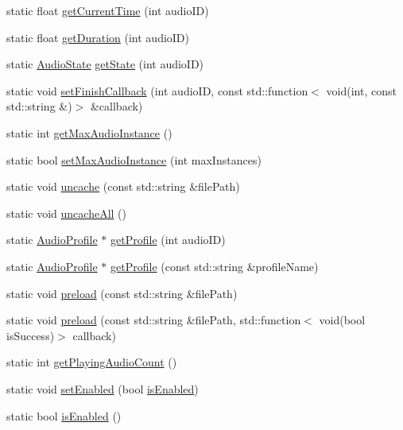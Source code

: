 \begin{DoxyCompactItemize}
\item 
static float \hyperlink{classexperimental_1_1AudioEngine_a03c38415583bde325e604cc9310d06ad}{get\+Current\+Time} (int audio\+ID)
\item 
static float \hyperlink{classexperimental_1_1AudioEngine_a09b8db5b79cc1dbdd99b57047cbc9d79}{get\+Duration} (int audio\+ID)
\item 
static \hyperlink{classexperimental_1_1AudioEngine_ab7becf9cab1f5e4cac089a1f6e3785e6}{Audio\+State} \hyperlink{classexperimental_1_1AudioEngine_a866cda5e583d0dce1b74fa596cae8ac1}{get\+State} (int audio\+ID)
\item 
static void \hyperlink{classexperimental_1_1AudioEngine_a641027899b3a5145093c4db1fae2d1ed}{set\+Finish\+Callback} (int audio\+ID, const std\+::function$<$ void(int, const std\+::string \&)$>$ \&callback)
\item 
static int \hyperlink{classexperimental_1_1AudioEngine_aa372906cea71863ac9c75873477ab049}{get\+Max\+Audio\+Instance} ()
\item 
static bool \hyperlink{classexperimental_1_1AudioEngine_a98a3cd56d393541c2c9d82620bbe0d84}{set\+Max\+Audio\+Instance} (int max\+Instances)
\item 
static void \hyperlink{classexperimental_1_1AudioEngine_ad4845a8b7855fc7f40058c86069f2a80}{uncache} (const std\+::string \&file\+Path)
\item 
static void \hyperlink{classexperimental_1_1AudioEngine_acd68e5058545e8daf10e28c5e66e8ef5}{uncache\+All} ()
\item 
static \hyperlink{classexperimental_1_1AudioProfile}{Audio\+Profile} $\ast$ \hyperlink{classexperimental_1_1AudioEngine_a9681b3ec692d7db066f9a4ce1564a5d2}{get\+Profile} (int audio\+ID)
\item 
static \hyperlink{classexperimental_1_1AudioProfile}{Audio\+Profile} $\ast$ \hyperlink{classexperimental_1_1AudioEngine_aadf65363a78655e56c65c4153f8c5bcd}{get\+Profile} (const std\+::string \&profile\+Name)
\item 
static void \hyperlink{classexperimental_1_1AudioEngine_ad4c37774e18b30de41731d22d467b0df}{preload} (const std\+::string \&file\+Path)
\item 
static void \hyperlink{classexperimental_1_1AudioEngine_abcbafbd980c76ea03872286fd9211b80}{preload} (const std\+::string \&file\+Path, std\+::function$<$ void(bool is\+Success)$>$ callback)
\item 
static int \hyperlink{classexperimental_1_1AudioEngine_a47fa881c2d7a3e2604dd7c885f249f51}{get\+Playing\+Audio\+Count} ()
\item 
static void \hyperlink{classexperimental_1_1AudioEngine_ae004f7785eb2ad3aa31db7db912d4622}{set\+Enabled} (bool \hyperlink{classexperimental_1_1AudioEngine_ad19723d962f48b9b25feb73382d6688c}{is\+Enabled})
\item 
static bool \hyperlink{classexperimental_1_1AudioEngine_ad19723d962f48b9b25feb73382d6688c}{is\+Enabled} ()
\end{DoxyCompactItemize}
